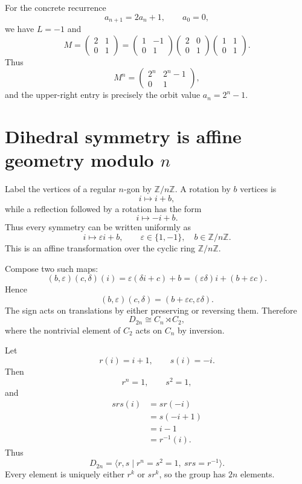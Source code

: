For the concrete recurrence
\[
  a_{n+1}=2a_n+1,
  \qquad
  a_0=0,
\]
we have \(L=-1\) and
\[
  M=
  \begin{pmatrix}2&1\\0&1\end{pmatrix}
  =
  \begin{pmatrix}1&-1\\0&1\end{pmatrix}
  \begin{pmatrix}2&0\\0&1\end{pmatrix}
  \begin{pmatrix}1&1\\0&1\end{pmatrix}.
\]
Thus
\[
  M^n=
  \begin{pmatrix}2^n&2^n-1\\0&1\end{pmatrix},
\]
and the upper-right entry is precisely the orbit value \(a_n=2^n-1\).

\section{Dihedral symmetry is affine geometry modulo \texorpdfstring{$n$}{n}}

Label the vertices of a regular \(n\)-gon by \(\mathbb Z/n\mathbb Z\).  A rotation by \(b\) vertices is
\[
  i\longmapsto i+b,
\]
while a reflection followed by a rotation has the form
\[
  i\longmapsto -i+b.
\]
Thus every symmetry can be written uniformly as
\[
  i\longmapsto \varepsilon i+b,
  \qquad
  \varepsilon\in\{1,-1\},
  \quad b\in\mathbb Z/n\mathbb Z.
\]
This is an affine transformation over the cyclic ring \(\mathbb Z/n\mathbb Z\).

Compose two such maps:
\[
  (b,\varepsilon)(c,\delta)(i)
  =\varepsilon(\delta i+c)+b
  =(\varepsilon\delta)i+(b+\varepsilon c).
\]
Hence
\[
  (b,\varepsilon)(c,\delta)
  =(b+\varepsilon c,\varepsilon\delta).
\]
The sign acts on translations by either preserving or reversing them.  Therefore
\[
  D_{2n}\cong C_n\rtimes C_2,
\]
where the nontrivial element of \(C_2\) acts on \(C_n\) by inversion.

Let
\[
  r(i)=i+1,
  \qquad
  s(i)=-i.
\]
Then
\[
  r^n=1,
  \qquad
  s^2=1,
\]
and
\[
\begin{aligned}
  srs(i)
  &=sr(-i)\\
  &=s(-i+1)\\
  &=i-1\\
  &=r^{-1}(i).
\end{aligned}
\]
Thus
\[
  D_{2n}
  =\langle r,s\mid r^n=s^2=1,\ srs=r^{-1}\rangle.
\]
Every element is uniquely either \(r^k\) or \(sr^k\), so the group has \(2n\) elements.

